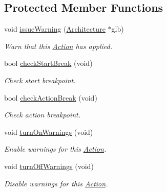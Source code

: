 \subsection*{Protected Member Functions}
\begin{DoxyCompactItemize}
\item 
void \mbox{\hyperlink{class_action_a04e458190e48fb7aeeb49088b92488bd}{issue\+Warning}} (\mbox{\hyperlink{class_architecture}{Architecture}} $\ast$glb)
\begin{DoxyCompactList}\small\item\em Warn that this \mbox{\hyperlink{class_action}{Action}} has applied. \end{DoxyCompactList}\item 
bool \mbox{\hyperlink{class_action_a2b657446cbd46f656b1d9f2dcbb1f4dc}{check\+Start\+Break}} (void)
\begin{DoxyCompactList}\small\item\em Check start breakpoint. \end{DoxyCompactList}\item 
bool \mbox{\hyperlink{class_action_a81d7c72d8a23e60786cc47fc52d2112f}{check\+Action\+Break}} (void)
\begin{DoxyCompactList}\small\item\em Check action breakpoint. \end{DoxyCompactList}\item 
void \mbox{\hyperlink{class_action_a5784987d90d4ab2cac5c91c32e24c602}{turn\+On\+Warnings}} (void)
\begin{DoxyCompactList}\small\item\em Enable warnings for this \mbox{\hyperlink{class_action}{Action}}. \end{DoxyCompactList}\item 
void \mbox{\hyperlink{class_action_a7ee7521e4259621cc001ea272ace4778}{turn\+Off\+Warnings}} (void)
\begin{DoxyCompactList}\small\item\em Disable warnings for this \mbox{\hyperlink{class_action}{Action}}. \end{DoxyCompactList}\end{DoxyCompactItemize}
